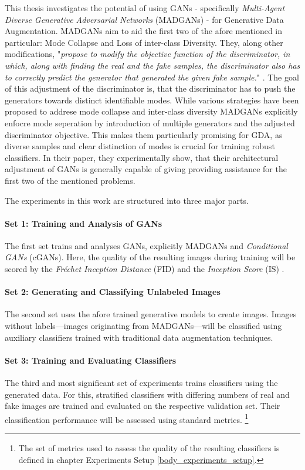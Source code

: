 This thesis investigates the potential of using GANs - specifically \textit{Multi-Agent Diverse Generative Adversarial Networks} (MADGANs) \cite{ghosh2018madgan} - for Generative Data Augmentation. MADGANs aim to aid the first two of the afore mentioned in particular: Mode Collapse and Loss of inter-class Diversity. They, along other modifications, "\textit{propose to modify the objective function of the discriminator, in which, along with finding the real and the fake samples, the discriminator also has to correctly predict the generator that generated the given fake sample.}" \cite{ghosh2018madgan}. The goal of this adjustment of the discriminator is, that the discriminator has to push the generators towards distinct identifiable modes. While various strategies have been proposed to addrese mode collapse and inter-class diversity MADGANs explicitly enfocre mode seperation by introduction of multiple generators and the adjusted discriminator objective. This makes them particularly promising for GDA, as diverse samples and clear distinction of modes is crucial for training robust classifiers. In their paper, they experimentally show, that their architectural adjustment of GANs is generally capable of giving providing assistance for the first two of the mentioned problems.

The experiments in this work are structured into three major parts.

\paragraph{Set 1: Training and Analysis of GANs}  \label{thesis_goal_1}
The first set trains and analyses GANs, explicitly MADGANs and \textit{Conditional GANs} (cGANs). Here, the quality of the resulting images during training will be scored by the \textit{Fréchet Inception Distance} (FID) \cite{heusel2018ganstrainedtimescaleupdate} and the \textit{Inception Score} (IS) \cite{salimans2016improvedtechniquestraininggans}.

\paragraph{Set 2: Generating and Classifying Unlabeled Images}  \label{thesis_goal_2}
The second set uses the afore trained generative models to create images. Images without labels—images originating from MADGANs—will be classified using auxiliary classifiers trained with traditional data augmentation techniques.

\paragraph{Set 3: Training and Evaluating Classifiers}  \label{thesis_goal_3}
The third and most significant set of experiments trains classifiers using the generated data. For this, stratified classifiers with differing numbers of real and fake images are trained and evaluated on the respective validation set. Their classification performance will be assessed using standard metrics.
\footnote{The set of metrics used to assess the quality of the resulting classifiers is defined in chapter Experiments Setup \ref{body_experiments_setup}.}
\\

